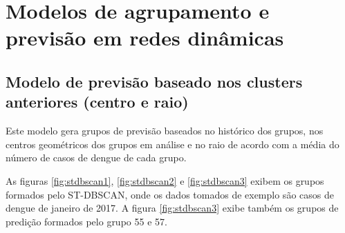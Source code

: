 \chapter{Modelos de agrupamento e previsão em redes dinâmicas}
\label{chap:modelo-agrupamento}

\section{Modelo de previsão baseado nos clusters anteriores (centro e raio)}

Este modelo gera grupos de previsão baseados no histórico dos grupos, nos centros geométricos dos grupos em análise e no raio de acordo com a média do número de casos de dengue de cada grupo.

As figuras \ref{fig:stdbscan1}, \ref{fig:stdbscan2} e \ref{fig:stdbscan3} exibem os grupos formados pelo ST-DBSCAN, onde os dados tomados de exemplo são casos de dengue de janeiro de 2017.
A figura \ref{fig:stdbscan3} exibe também os grupos de predição formados pelo grupo 55 e 57.

\begin{figure}[!ht]
	\centering	
\end{figure}
\FloatBarrier

\begin{figure}[!ht]
	\centering	
\end{figure}
\FloatBarrier


